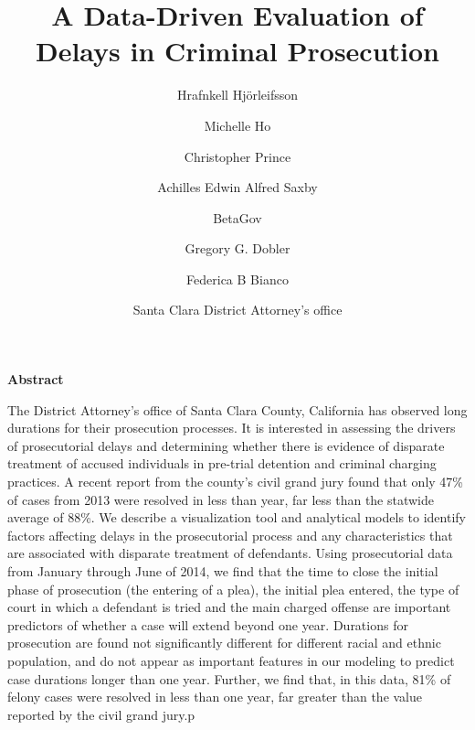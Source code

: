 \documentclass{AISB2008}
\begin{document}
\title{A Data-Driven Evaluation of Delays in Criminal Prosecution}


\author{Hrafnkell Hjörleifsson \\
  \and Michelle Ho\\
  \and Christopher Prince\\
  \and Achilles Edwin Alfred Saxby\\
  \and BetaGov \\
   \and Gregory G. Dobler\\
   \and Federica B Bianco\\
   \and Santa Clara District Attorney's office}


\maketitle




\textbf{Abstract}

The District Attorney's office of Santa Clara County, California has
observed long durations for their prosecution processes. It is
interested in assessing the drivers of prosecutorial delays and
determining whether there is evidence of disparate treatment of accused
individuals in pre-trial detention and criminal charging practices. A
recent report from the county's civil grand jury found that only 47\% of
cases from 2013 were resolved in less than year, far less than the
statwide average of 88\%. We describe a visualization tool and
analytical models to identify factors affecting delays in the
prosecutorial process and any characteristics that are associated with
disparate treatment of defendants. Using prosecutorial data from January
through June of 2014, we find that the time to close the initial phase
of prosecution (the entering of a plea), the initial plea entered, the
type of court in which a defendant is tried and the main charged offense
are important predictors of whether a case will extend beyond one year.
Durations for prosecution are found not significantly different for
different racial and ethnic population, and do not appear as important
features in our modeling to predict case durations longer than one year.
Further, we find that, in this data, 81\% of felony cases were resolved
in less than one year, far greater than the value reported by the civil
grand jury.p
\end{document}
